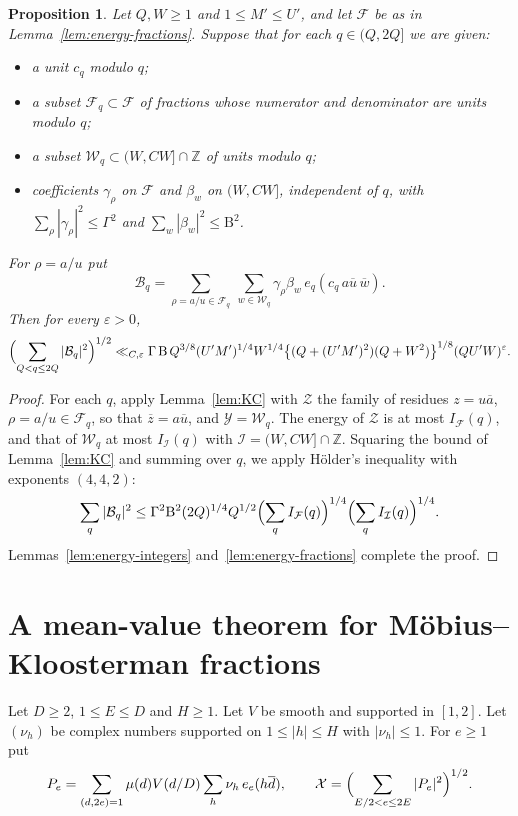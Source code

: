 \documentclass[11pt]{amsart}
\newtheorem{proposition}[theorem]{Proposition}
\theoremstyle{definition}
\theoremstyle{remark}
\numberwithin{equation}{section}
\newcommand{\Z}{\mathbb Z}
\newcommand{\cF}{\mathcal F}
\newcommand{\cW}{\mathcal W}
\newcommand{\cX}{\mathcal X}
\newcommand{\cB}{\mathcal B}
\newcommand{\eps}{\varepsilon}
\newcommand{\inv}[1]{\overline{#1}}
\begin{document}
\begin{proposition}\label{prop:bilinear}
Let $Q,W\ge1$ and $1\le M'\le U'$, and let $\cF$ be as in
Lemma~\ref{lem:energy-fractions}.  Suppose that for each
$q\in(Q,2Q]$ we are given:
\begin{itemize}
\item a unit $c_q$ modulo $q$;
\item a subset $\cF_q\subset\cF$ of fractions whose numerator and
denominator are units modulo $q$;
\item a subset $\cW_q\subset(W,CW]\cap\Z$ of units modulo $q$;
\item coefficients $\gamma_\rho$ on $\cF$ and $\beta_w$ on $(W,CW]$,
independent of $q$, with $\sum_\rho|\gamma_\rho|^2\le\Gamma^2$ and
$\sum_w|\beta_w|^2\le\mathrm B^2$.
\end{itemize}
For $\rho=a/u$ put
\[
 \cB_q=\sum_{\rho=a/u\in\cF_q}\ \sum_{w\in\cW_q}
 \gamma_\rho\beta_w\,e_q(c_q\,a\inv u\,\inv w).
\]
Then for every $\eps>0$,
\[
 \Bigl(\sum_{Q<q\le2Q}|\cB_q|^2\Bigr)^{1/2}
 \ll_{C,\eps}\Gamma\,\mathrm B\,Q^{3/8}(U'M')^{1/4}W^{1/4}
 \bigl\{(Q+(U'M')^2)(Q+W^2)\bigr\}^{1/8}(QU'W)^{\eps}.
\]
\end{proposition}

\begin{proof}
For each $q$, apply Lemma~\ref{lem:KC} with $\mathcal Z$ the family of
residues $z=u\inv a$, $\rho=a/u\in\cF_q$, so that $\inv z=a\inv u$, and
$\mathcal Y=\cW_q$.  The energy of $\mathcal Z$ is at most $I_\cF(q)$, and
that of $\cW_q$ at most $I_{\mathcal I}(q)$ with
$\mathcal I=(W,CW]\cap\Z$.  Squaring the bound of Lemma~\ref{lem:KC} and
summing over $q$, we apply H\"older's inequality with exponents $(4,4,2)$:
\[
 \sum_q|\cB_q|^2\le\Gamma^2\mathrm B^2(2Q)^{1/4}Q^{1/2}
 \Bigl(\sum_qI_\cF(q)\Bigr)^{1/4}\Bigl(\sum_qI_{\mathcal I}(q)\Bigr)^{1/4}.
\]
Lemmas~\ref{lem:energy-integers} and~\ref{lem:energy-fractions} complete the
proof.
\end{proof}

\section{A mean-value theorem for M\"obius--Kloosterman fractions}\label{sec:meanvalue}

Let $D\ge2$, $1\le E\le D$ and $H\ge1$.  Let $V$ be smooth and supported in
$[1,2]$.  Let $(\nu_h)$ be complex numbers supported on $1\le|h|\le H$ with
$|\nu_h|\le1$.  For $e\ge1$ put
\begin{equation}\label{eq:Pe}
 P_e=\sum_{(d,2e)=1}\mu(d)V(d/D)\sum_h\nu_h\,e_e(h\inv d),
 \qquad
 \cX=\Bigl(\sum_{E/2<e\le2E}|P_e|^2\Bigr)^{1/2}.
\end{equation}
\end{document}
